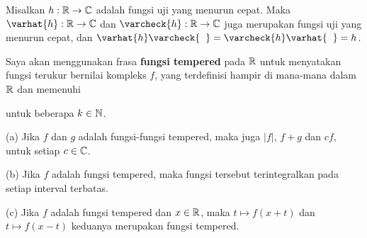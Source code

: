  Misalkan $h:\Bbb R\to\Bbb C$ adalah fungsi uji yang
menurun cepat. Maka $\varhat{h}:\Bbb R\to\Bbb C$ dan $\varcheck{h}:\Bbb
R\to\Bbb C$ juga merupakan fungsi uji yang menurun cepat, dan
$\varhat{h}\varcheck{\phantom{h}} = \varcheck{h}\varhat{\phantom{h}} = h$.


 Saya akan menggunakan frasa {\bf fungsi tempered} pada
$\Bbb R$ untuk menyatakan fungsi terukur bernilai kompleks $f$, yang
terdefinisi hampir di mana-mana dalam $\Bbb R$ dan memenuhi


\noindent untuk beberapa $k\in\Bbb N$.

 (a) Jika $f$ dan $g$ adalah fungsi-fungsi tempered, maka
juga $|f|$, $f+g$ dan $cf$, untuk setiap $c\in\Bbb C$.

(b) Jika $f$ adalah fungsi tempered, maka fungsi tersebut terintegralkan pada
setiap interval terbatas.

(c) Jika $f$ adalah fungsi tempered dan $x\in\Bbb R$, maka $t\mapsto f(x+t)$
dan $t\mapsto f(x-t)$ keduanya merupakan fungsi tempered.

